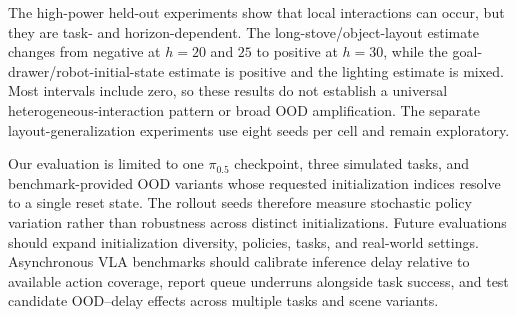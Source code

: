 \documentclass{article}
\begin{document}
The high-power held-out experiments show that local interactions can occur, but they are task- and horizon-dependent. The long-stove/object-layout estimate changes from negative at \(h=20\) and \(25\) to positive at \(h=30\), while the goal-drawer/robot-initial-state estimate is positive and the lighting estimate is mixed. Most intervals include zero, so these results do not establish a universal heterogeneous-interaction pattern or broad OOD amplification. The separate layout-generalization experiments use eight seeds per cell and remain exploratory.

Our evaluation is limited to one \(\pi_{0.5}\) checkpoint, three simulated tasks, and benchmark-provided OOD variants whose requested initialization indices resolve to a single reset state. The rollout seeds therefore measure stochastic policy variation rather than robustness across distinct initializations. Future evaluations should expand initialization diversity, policies, tasks, and real-world settings. Asynchronous VLA benchmarks should calibrate inference delay relative to available action coverage, report queue underruns alongside task success, and test candidate OOD--delay effects across multiple tasks and scene variants.
\end{document}
